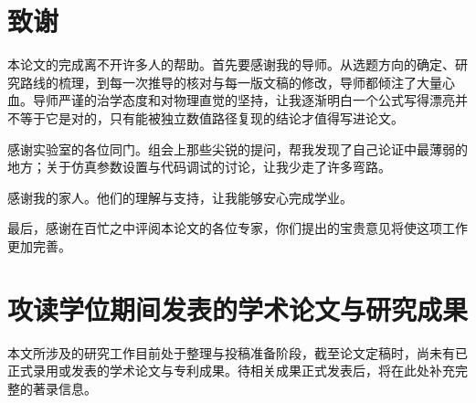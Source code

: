 \documentclass[12pt,a4paper,openany,UTF8]{ctexrep}
\begin{document}


\chapter*{致谢}

本论文的完成离不开许多人的帮助。首先要感谢我的导师。从选题方向的确定、研究路线的梳理，到每一次推导的核对与每一版文稿的修改，导师都倾注了大量心血。导师严谨的治学态度和对物理直觉的坚持，让我逐渐明白一个公式写得漂亮并不等于它是对的，只有能被独立数值路径复现的结论才值得写进论文。

感谢实验室的各位同门。组会上那些尖锐的提问，帮我发现了自己论证中最薄弱的地方；关于仿真参数设置与代码调试的讨论，让我少走了许多弯路。

感谢我的家人。他们的理解与支持，让我能够安心完成学业。

最后，感谢在百忙之中评阅本论文的各位专家，你们提出的宝贵意见将使这项工作更加完善。
\newpage

\chapter*{攻读学位期间发表的学术论文与研究成果}

本文所涉及的研究工作目前处于整理与投稿准备阶段，截至论文定稿时，尚未有已正式录用或发表的学术论文与专利成果。待相关成果正式发表后，将在此处补充完整的著录信息。
\end{document}

